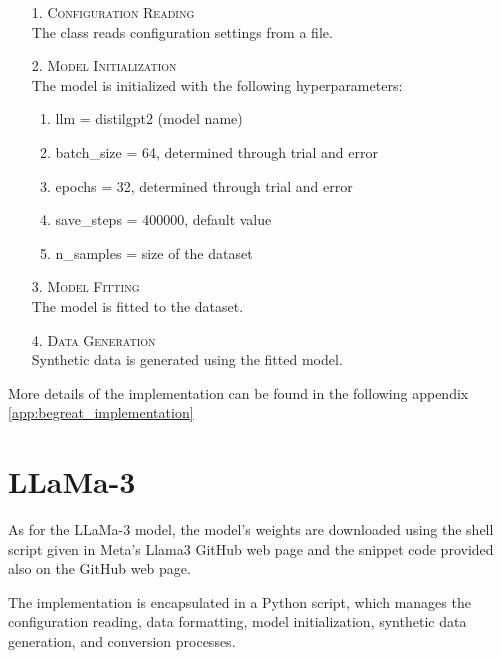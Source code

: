 \begin{enumerate}
    \item[1.] \textsc{Configuration Reading}\\ 
    The class reads configuration settings from a file.
    
    \item[2.] \textsc{Model Initialization}\\
    The model is initialized with the following hyperparameters:
        \begin{enumerate}
            \item llm = distilgpt2 (model name)
            \item batch\_size = 64, determined through trial and error
            \item epochs = 32, determined through trial and error
            \item save\_steps = 400000, default value
            \item n\_samples = size of the dataset
        \end{enumerate}

    \item[3.] \textsc{Model Fitting}\\ 
    The model is fitted to the dataset.
    
    \item[4.] \textsc{Data Generation}\\
    Synthetic data is generated using the fitted model.
\end{enumerate}

\noindent More details of the implementation can be found in the following appendix \ref{app:begreat_implementation}






\vspace{0.5cm}
\section{LLaMa-3}

As for the LLaMa-3 model, the model's weights are downloaded using the shell script given in Meta's Llama3 GitHub web page and the snippet code provided also on the GitHub web page. 

The implementation is encapsulated in a Python script, which manages the configuration reading, data formatting, model initialization, synthetic data generation, and conversion processes.

